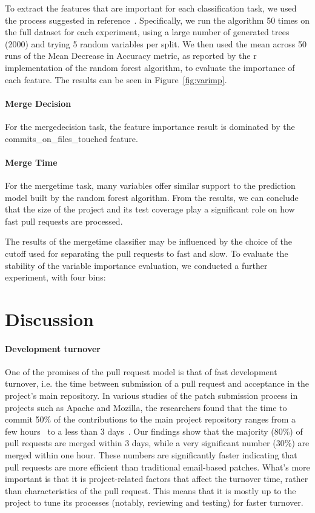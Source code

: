 \documentclass{sig-alternate}
\begin{document}
To extract the features that are important for each classification task, we
used the process suggested in reference~\cite{Genue10}. Specifically, we run
the algorithm 50 times on the full dataset for each experiment, using a large
number of generated trees (2000) and trying 5 random variables per split. We
then used the mean across 50 runs of the  Mean Decrease in Accuracy metric, as
reported by the {\sc r} implementation of the random forest algorithm, to
evaluate the importance of each feature. The results can be seen in
Figure~\ref{fig:varimp}.

\paragraph{Merge Decision}

For the \textsf{mergedecision} task, the feature importance result is dominated
by the \textsf{commits\_on\_files\_touched} feature. 

\paragraph{Merge Time}

For the \textsf{mergetime} task, many variables offer similar support to the
prediction model built by the random forest algorithm. From the results, we can
conclude that the size of the project and its test coverage play a significant
role on how fast pull requests are processed. 

The results of the \textsf{mergetime} classifier may be influenced by the choice of the cutoff used for separating the pull requests to fast and slow.
To evaluate the stability of the variable importance evaluation, we conducted
a further experiment, with four bins: 


\section{Discussion}

\label{sec:discussion}

\paragraph{Development turnover} One of the promises of the pull request model
is that of fast development turnover, i.e. the time between submission of a pull
request and acceptance in the project's main repository.  In various studies of
the patch submission process in projects such as Apache and Mozilla, the
researchers found that the time to commit 50\% of the contributions to the main
project repository ranges from a few hours~\cite{Rigby08} to a less than 3
days~\cite{Weiss08, Baysal12}. Our findings show that the majority (80\%) of
pull requests are merged within 3 days, while a very significant number (30\%)
are merged within one hour. These numbers are significantly faster indicating
that pull requests are more efficient than traditional email-based patches.
What's more important is that it is project-related factors that affect the
turnover time, rather than characteristics of the pull request. This means that
it is mostly up to the project to tune its processes (notably, reviewing and
testing) for faster turnover.  
\end{document}
